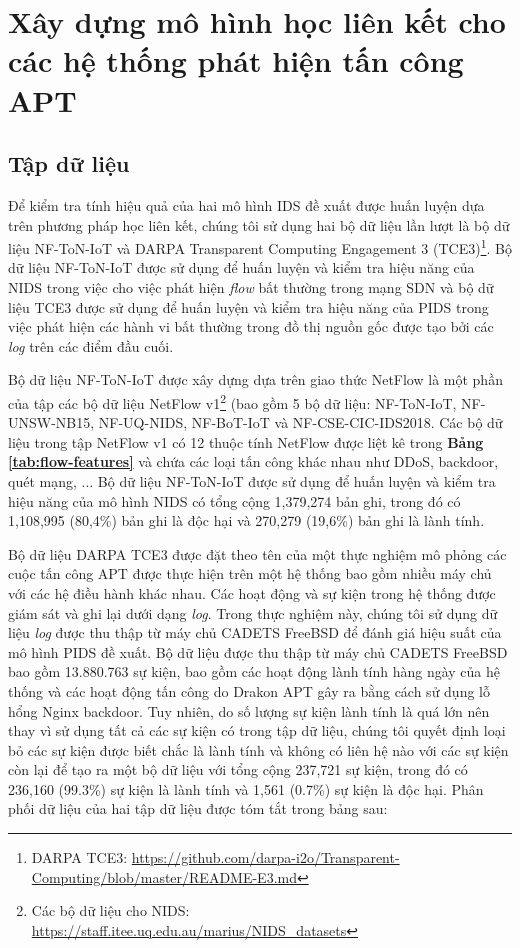 \section{Xây dựng mô hình học liên kết cho các hệ thống phát hiện tấn công APT} \label{sec:implemented-FL-based-IDS}

\subsection{Tập dữ liệu}

Để kiểm tra tính hiệu quả của hai mô hình IDS đề xuất được huấn luyện dựa trên phương pháp học liên kết, chúng tôi sử dụng hai bộ dữ liệu lần lượt là bộ dữ liệu NF-ToN-IoT và DARPA Transparent Computing Engagement 3 (TCE3)\footnote{DARPA TCE3: \url{https://github.com/darpa-i2o/Transparent-Computing/blob/master/README-E3.md}}. Bộ dữ liệu NF-ToN-IoT được sử dụng để huấn luyện và kiểm tra hiệu năng của NIDS trong việc cho việc phát hiện \textit{flow} bất thường trong mạng SDN và bộ dữ liệu TCE3 được sử dụng để huấn luyện và kiểm tra hiệu năng của PIDS trong việc phát hiện các hành vi bất thường trong đồ thị nguồn gốc được tạo bởi các \textit{log} trên các điểm đầu cuối.

\bigbreak\noindent
Bộ dữ liệu NF-ToN-IoT được xây dựng dựa trên giao thức NetFlow \cite{sarhan2020netflow} là một phần của tập các bộ dữ liệu NetFlow v1\footnote{Các bộ dữ liệu cho NIDS: \url{https://staff.itee.uq.edu.au/marius/NIDS_datasets}} (bao gồm 5 bộ dữ liệu: NF-ToN-IoT, NF-UNSW-NB15, NF-UQ-NIDS, NF-BoT-IoT và NF-CSE-CIC-IDS2018. Các bộ dữ liệu trong tập NetFlow v1 có 12 thuộc tính NetFlow được liệt kê trong \textbf{Bảng \ref{tab:flow-features}} và chứa các loại tấn công khác nhau như DDoS, backdoor, quét mạng, ... Bộ dữ liệu NF-ToN-IoT được sử dụng để huấn luyện và kiểm tra hiệu năng của mô hình NIDS có tổng cộng 1,379,274 bản ghi, trong đó có 1,108,995 (80,4\%) bản ghi là độc hại và 270,279 (19,6\%) bản ghi là lành tính.

\bigbreak\noindent
Bộ dữ liệu DARPA TCE3 được đặt theo tên của một thực nghiệm mô phỏng các cuộc tấn công APT được thực hiện trên một hệ thống bao gồm nhiều máy chủ với các hệ điều hành khác nhau. Các hoạt động và sự kiện trong hệ thống được giám sát và ghi lại dưới dạng \textit{log}. Trong thực nghiệm này, chúng tôi sử dụng dữ liệu \textit{log} được thu thập từ máy chủ CADETS FreeBSD để đánh giá hiệu suất của mô hình PIDS đề xuất. Bộ dữ liệu được thu thập từ máy chủ CADETS FreeBSD bao gồm 13.880.763 sự kiện, bao gồm các hoạt động lành tính hàng ngày của hệ thống và các hoạt động tấn công do Drakon APT gây ra bằng cách sử dụng lỗ hổng Nginx backdoor. Tuy nhiên, do số lượng sự kiện lành tính là quá lớn nên thay vì sử dụng tất cả các sự kiện có trong tập dữ liệu, chúng tôi quyết định loại bỏ các sự kiện được biết chắc là lành tính và không có liên hệ nào với các sự kiện còn lại để tạo ra một bộ dữ liệu với tổng cộng 237,721 sự kiện, trong đó có 236,160 (99.3\%) sự kiện là lành tính và 1,561 (0.7\%) sự kiện là độc hại.
\bigbreak\noindent
Phân phối dữ liệu của hai tập dữ liệu được tóm tắt trong bảng sau:

